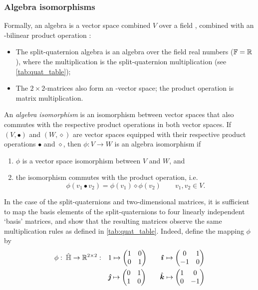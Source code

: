 \subsubsection{Algebra isomorphisms} 
Formally, an algebra is a vector space combined \(V\) over a field \field, combined with an \field-bilinear product operation \cite{Schuller2014}:
\begin{itemize}
    \item The split-quaternion algebra is an algebra over the field real numbers (\(\mathbb{F} = \mathbb{R}\)), where the multiplication is the split-quaternion multiplication (see \cref{tab:quat_table});
    \item The \(2\times2\)-matrices also form an \real-vector space; the product operation is matrix multiplication.
\end{itemize}

An \emph{algebra isomorphism} is an isomorphism between vector spaces that also commutes with the respective product operations in both vector spaces. If \((V, \bullet)\) and \((W, \diamond)\) are vector spaces equipped with their respective product operations $\bullet$ and $\diamond$, then \(\phi: V \to W\) is an algebra isomorphism if \cite{Lang2002}
\begin{enumerate}[label=(\roman*), align=left, leftmargin=1.5cm]
    \item \(\phi\) is a vector space isomorphism between \(V\) and \(W\), and 
    \item the isomorphism commutes with the product operation, i.e. 
    \begin{equation}
         \phi(v_1 \bullet v_2) = \phi(v_1)\diamond\phi(v_2) \qquad v_1, v_2 \in V.
    \end{equation}
\end{enumerate}

In the case of the split-quaternions and two-dimensional matrices, it is sufficient to map the basis elements of the split-quaternions to four linearly independent `basis' matrices, and show that the resulting matrices observe the same multiplication rules as defined in \cref{tab:quat_table}. Indeed, define the mapping \(\phi\) by 
\begin{equation}
    \begin{split}
        \phi: \: \spquaternions \to \real^{2\times2}: \quad &  
         1 \mapsto  \mqty(1 & 0 \\ 0 & 1) \qquad
        \quati \mapsto  \mqty(0 & 1 \\  -1 & 0) \\
        & \quatj \mapsto  \mqty(0 & 1 \\  1 & 0)\qquad 
        \quatk \mapsto  \mqty(1 & 0 \\  0 & -1) \\
    \end{split}
    \label{eq:basis_elements}
\end{equation}

